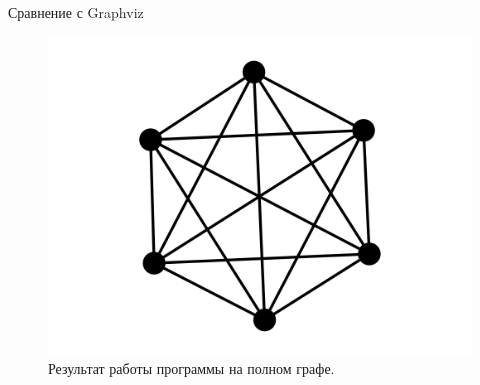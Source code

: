 \documentclass{beamer}
\begin{document}
\begin{frame}{Сравнение с Graphviz}
\begin{figure}[H]
\begin{minipage}[t]{.32\textwidth}
			\includegraphics[width=\linewidth]{./imgs/k6_gv.png}
			\caption*{Graphviz.}
		\end{minipage}
		\caption{Результат работы программы на полном графе.}
	\end{figure}
\end{frame}
\end{document}
